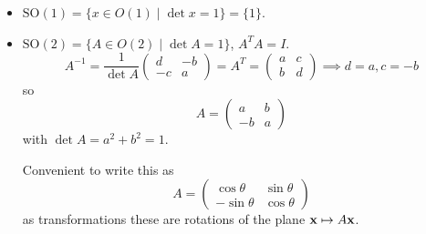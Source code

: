 \documentclass[10pt, a4paper]{article}
\begin{document}
\begin{example}
    \begin{itemize}
        \item $\mathrm{SO}(1) = \{x \in O(1)\mid\det{x} = 1\} = \{1\}$.

        \item $\mathrm{SO}(2) = \{A \in O(2)\mid\det{A} = 1\}$,
        $A ^ TA = I$.
        \[
        A ^ {-1} = \frac{1}{\det{A}}\begin{pmatrix}
            d & -b \\ -c & a
        \end{pmatrix} = A ^ T = \begin{pmatrix}
            a & c \\ b & d
        \end{pmatrix} \implies d = a, c = -b
        \]
        so
        \[
        A = \begin{pmatrix}
            a & b \\ -b & a
        \end{pmatrix}
        \]
        with $\det{A} = a ^ 2 + b ^ 2 = 1$.

        Convenient to write this as
        \[
        A = \begin{pmatrix}
            \cos{\theta} & \sin{\theta} \\
            -\sin{\theta} & \cos{\theta}
        \end{pmatrix}
        \]
        as transformations these are rotations of the plane $\mathbf{x} \mapsto A\mathbf{x}$.
    \end{itemize}
\end{example}
\end{document}
